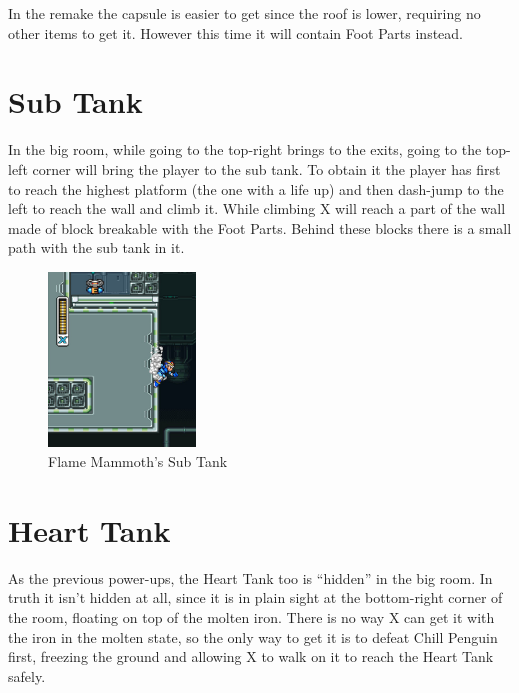 In the \mhx remake the capsule is easier to get since the roof is lower, requiring no other items to get it. However this time it will contain Foot Parts instead.

\section{Sub Tank}
In the big room, while going to the top-right brings to the exits, going to the top-left corner will bring the player to the sub tank. To obtain it the player has first to reach the highest platform (the one with a life up) and then dash-jump to the left to reach the wall and climb it. While climbing X will reach a part of the wall made of block breakable with the Foot Parts. Behind these blocks there is a small path with the sub tank in it.
\begin{figure}[h]
	\centering
	\includegraphics[width=0.35\textwidth]{figures/X1/Flame_mammoth/Flame_tank.jpg}
	\caption{Flame Mammoth's Sub Tank}
\end{figure}



\section{Heart Tank}
As the previous power-ups, the Heart Tank too is ``hidden'' in the big room. In truth it isn't hidden at all, since it is in plain sight at the bottom-right corner of the room, floating on top of the molten iron. There is no way X can get it with the iron in the molten state, so the only way to get it is to defeat Chill Penguin first, freezing the ground and allowing X to walk on it to reach the Heart Tank safely.

